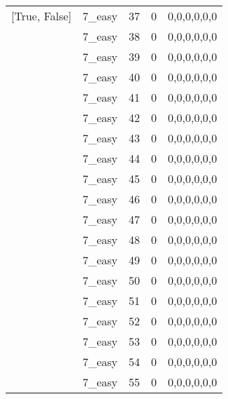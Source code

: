 \begin{tabular}{llrrl}
 [True, False]   & 7\_easy              &            37 &                     0 & 0,0,0,0,0,0   \\
 [True, False]   & 7\_easy              &            38 &                     0 & 0,0,0,0,0,0   \\
 [True, False]   & 7\_easy              &            39 &                     0 & 0,0,0,0,0,0   \\
 [True, False]   & 7\_easy              &            40 &                     0 & 0,0,0,0,0,0   \\
 [True, False]   & 7\_easy              &            41 &                     0 & 0,0,0,0,0,0   \\
 [True, False]   & 7\_easy              &            42 &                     0 & 0,0,0,0,0,0   \\
 [True, False]   & 7\_easy              &            43 &                     0 & 0,0,0,0,0,0   \\
 [True, False]   & 7\_easy              &            44 &                     0 & 0,0,0,0,0,0   \\
 [True, False]   & 7\_easy              &            45 &                     0 & 0,0,0,0,0,0   \\
 [True, False]   & 7\_easy              &            46 &                     0 & 0,0,0,0,0,0   \\
 [True, False]   & 7\_easy              &            47 &                     0 & 0,0,0,0,0,0   \\
 [True, False]   & 7\_easy              &            48 &                     0 & 0,0,0,0,0,0   \\
 [True, False]   & 7\_easy              &            49 &                     0 & 0,0,0,0,0,0   \\
 [True, False]   & 7\_easy              &            50 &                     0 & 0,0,0,0,0,0   \\
 [True, False]   & 7\_easy              &            51 &                     0 & 0,0,0,0,0,0   \\
 [True, False]   & 7\_easy              &            52 &                     0 & 0,0,0,0,0,0   \\
 [True, False]   & 7\_easy              &            53 &                     0 & 0,0,0,0,0,0   \\
 [True, False]   & 7\_easy              &            54 &                     0 & 0,0,0,0,0,0   \\
 [True, False]   & 7\_easy              &            55 &                     0 & 0,0,0,0,0,0   \\

\end{tabular}
